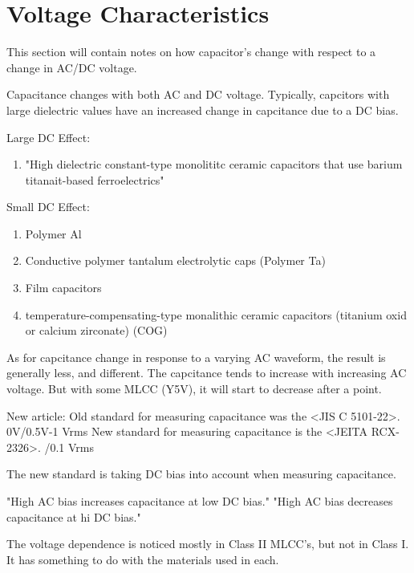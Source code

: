 \section {Voltage Characteristics}

\noindent This section will contain notes on how capacitor's change with respect to a change in AC/DC voltage.

\noindent Capacitance changes with both AC and DC voltage. Typically, capcitors with large dielectric values have an increased change in capcitance due to a DC bias.\cite{murVolChar}

\noindent Large DC Effect:
\begin {enumerate}
    \item "High dielectric constant-type monolititc ceramic capacitors that use barium titanait-based ferroelectrics"
\end {enumerate}

\noindent Small DC Effect:
\begin {enumerate}
    \item Polymer Al
    \item Conductive polymer tantalum electrolytic caps (Polymer Ta)
    \item Film capacitors
    \item temperature-compensating-type monalithic ceramic capacitors (titanium oxid or calcium zirconate) (COG)
\end {enumerate}

\noindent As for capcitance change in response to a varying AC waveform, the result is generally less, and different. The capcitance tends to increase with increasing AC voltage. But with some MLCC (Y5V), it will start to decrease after a point.  

\noindent New article: \cite{mur_mlcc_cirDes}
\noindent Old standard for measuring capacitance was the \textless JIS C 5101-22\textgreater.
\noindent 0V/0.5V-1 Vrms
\noindent New standard for measuring capacitance is the \textless JEITA RCX-2326\textgreater.
/0.1 Vrms

\noindent The new standard is taking DC bias into account when measuring capacitance.

\cite{oracle}
\noindent "High AC bias increases capacitance at low DC bias."
\noindent "High AC bias decreases capacitance at hi DC bias."

\noindent The voltage dependence is noticed mostly in Class II MLCC's, but not in Class I. It has something to do with the materials used in each.
